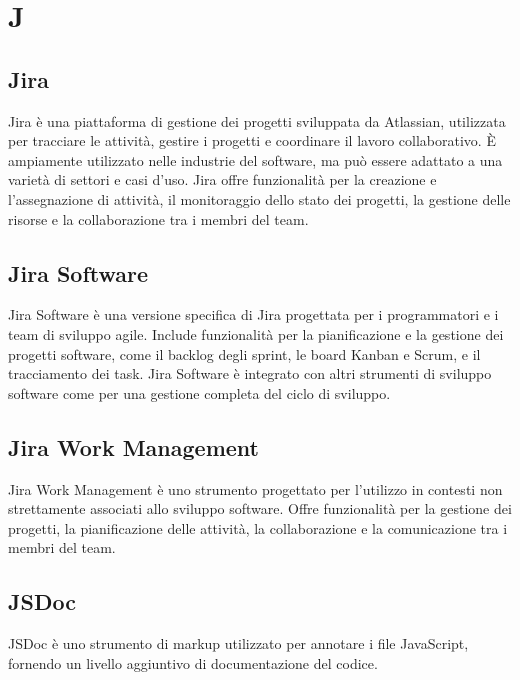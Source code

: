 \section{J}

\vspace{2em}
\subsection*{Jira}
\par Jira è una piattaforma di gestione dei progetti sviluppata da Atlassian, utilizzata per tracciare le attività, gestire i progetti e coordinare il lavoro collaborativo. È ampiamente utilizzato nelle industrie del software, ma può essere adattato a una varietà di settori e casi d'uso. Jira offre funzionalità per la creazione e l'assegnazione di attività, il monitoraggio dello stato dei progetti, la gestione delle risorse e la collaborazione tra i membri del team.

\vspace{2em}
\subsection*{Jira Software}
\par Jira Software è una versione specifica di Jira progettata per i programmatori e i team di sviluppo agile. Include funzionalità per la pianificazione e la gestione dei progetti software, come il backlog degli sprint, le board Kanban e Scrum, e il tracciamento dei task. Jira Software è integrato con altri strumenti di sviluppo software come  per una gestione completa del ciclo di sviluppo.

\vspace{2em}
\subsection*{Jira Work Management}
\par Jira Work Management è uno strumento progettato per l'utilizzo in contesti non strettamente associati allo sviluppo software. Offre funzionalità per la gestione dei progetti, la pianificazione delle attività, la collaborazione e la comunicazione tra i membri del team.

\vspace{2em}
\subsection*{JSDoc}
\par JSDoc è uno strumento di markup utilizzato per annotare i file JavaScript, fornendo un livello aggiuntivo di documentazione del codice.

